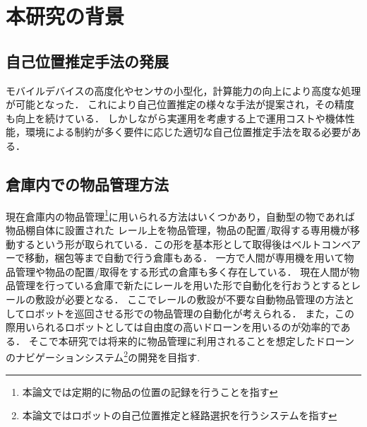 \section{本研究の背景}
\label{background}
\subsection{自己位置推定手法の発展}
モバイルデバイスの高度化やセンサの小型化，計算能力の向上により高度な処理が可能となった．
これにより自己位置推定の様々な手法が提案され，その精度も向上を続けている．
しかしながら実運用を考慮する上で運用コストや機体性能，環境による制約が多く要件に応じた適切な自己位置推定手法を取る必要がある．

\subsection{倉庫内での物品管理方法}
現在倉庫内の物品管理\footnote{本論文では定期的に物品の位置の記録を行うことを指す}に用いられる方法はいくつかあり，自動型の物であれば物品棚自体に設置された
レール上を物品管理，物品の配置/取得する専用機が移動するという形が取られている．この形を基本形として取得後はベルトコンベアーで移動，梱包等まで自動で行う倉庫もある．
一方で人間が専用機を用いて物品管理や物品の配置/取得をする形式の倉庫も多く存在している．
現在人間が物品管理を行っている倉庫で新たにレールを用いた形で自動化を行おうとするとレールの敷設が必要となる．
ここでレールの敷設が不要な自動物品管理の方法としてロボットを巡回させる形での物品管理の自動化が考えられる．
また，この際用いられるロボットとしては自由度の高いドローンを用いるのが効率的である．
そこで本研究では将来的に物品管理に利用されることを想定したドローンのナビゲーションシステム\footnote{本論文ではロボットの自己位置推定と経路選択を行うシステムを指す}の開発を目指す.

